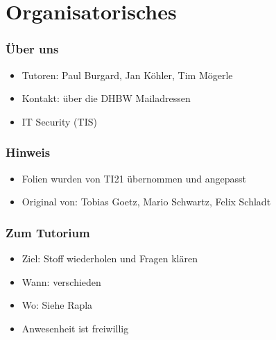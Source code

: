 \section{Organisatorisches}
\begin{frame}
    \frametitle{Über uns}
    \begin{itemize}
        \vfill \item Tutoren: Paul Burgard, Jan Köhler, Tim Mögerle
        \vfill \item Kontakt: über die DHBW Mailadressen
		\vfill \item IT Security (TIS)
    \end{itemize}
\end{frame}

\begin{frame}
    \frametitle{Hinweis}
    \begin{itemize}
        \vfill \item Folien wurden von TI21 übernommen und angepasst
        \vfill \item Original von: Tobias Goetz, Mario Schwartz, Felix Schladt
    \end{itemize}
\end{frame}

\begin{frame}
    \frametitle{Zum Tutorium}
    \begin{itemize}
        \vfill \item Ziel: Stoff wiederholen und Fragen klären
        \vfill \item Wann: verschieden
        \vfill \item Wo: Siehe Rapla
        \vfill \item Anwesenheit ist freiwillig
    \end{itemize}
\end{frame}
